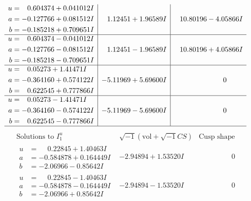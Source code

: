 \documentclass[1p]{elsarticle_modified}
\theoremstyle{definition}
\newcommand{\I}{\sqrt{-1}}
\begin{document}
$$\begin{array}{c|c|c}
\begin{aligned}
u &= \phantom{-}0.604374 + 0.041012 I \\
a &= -0.127766 + 0.081512 I \\
b &= -0.185218 + 0.709651 I\end{aligned}
 & \phantom{-}1.12451 + 1.96589 I & \phantom{-}10.80196 - 4.05866 I \\ \hline\begin{aligned}
u &= \phantom{-}0.604374 - 0.041012 I \\
a &= -0.127766 - 0.081512 I \\
b &= -0.185218 - 0.709651 I\end{aligned}
 & \phantom{-}1.12451 - 1.96589 I & \phantom{-}10.80196 + 4.05866 I \\ \hline\begin{aligned}
u &= \phantom{-}0.05273 + 1.41471 I \\
a &= -0.364160 + 0.574122 I \\
b &= \phantom{-}0.622545 + 0.777866 I\end{aligned}
 & -5.11969 + 5.69600 I & \phantom{-0.000000 } 0 \\ \hline\begin{aligned}
u &= \phantom{-}0.05273 - 1.41471 I \\
a &= -0.364160 - 0.574122 I \\
b &= \phantom{-}0.622545 - 0.777866 I\end{aligned}
 & -5.11969 - 5.69600 I & \phantom{-0.000000 } 0\\
 \hline 
 \end{array}$$\newpage$$\begin{array}{c|c|c}  
\text{Solutions to }I^u_{1}& \I (\text{vol} + \sqrt{-1}CS) & \text{Cusp shape}\\
 \hline 
\begin{aligned}
u &= \phantom{-}0.22845 + 1.40463 I \\
a &= -0.584878 + 0.164449 I \\
b &= -2.06966 - 0.85642 I\end{aligned}
 & -2.94894 + 1.53520 I & \phantom{-0.000000 } 0 \\ \hline\begin{aligned}
u &= \phantom{-}0.22845 - 1.40463 I \\
a &= -0.584878 - 0.164449 I \\
b &= -2.06966 + 0.85642 I\end{aligned}
 & -2.94894 - 1.53520 I & \phantom{-0.000000 } 0 \\ \hline\begin{aligned}

\end{aligned}
\end{array}$$
\end{document}
